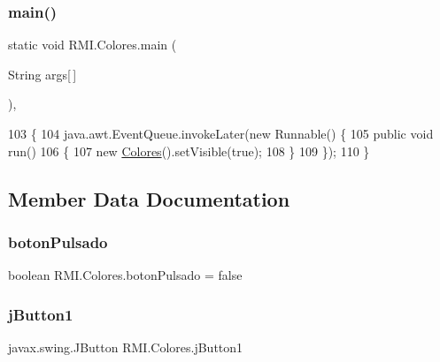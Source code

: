 \subsubsection{\texorpdfstring{main()}{main()}}
{\footnotesize\ttfamily static void R\+M\+I.\+Colores.\+main (\begin{DoxyParamCaption}\item[{String}]{args\mbox{[}$\,$\mbox{]} }\end{DoxyParamCaption})\hspace{0.3cm}{\ttfamily [inline]}, {\ttfamily [static]}}


\begin{DoxyCode}
103     \{
104         java.awt.EventQueue.invokeLater(\textcolor{keyword}{new} Runnable() \{
105             \textcolor{keyword}{public} \textcolor{keywordtype}{void} run()
106             \{
107                 \textcolor{keyword}{new} \mbox{\hyperlink{class_r_m_i_1_1_colores_a9d1a322e10d3c217309e02017973b5f0}{Colores}}().setVisible(\textcolor{keyword}{true});
108             \}
109         \});
110     \}
\end{DoxyCode}


\subsection{Member Data Documentation}
\mbox{\label{class_r_m_i_1_1_colores_af81a5077f5960e712338fe4962eadfe2}} 
\subsubsection{\texorpdfstring{boton\+Pulsado}{botonPulsado}}
{\footnotesize\ttfamily boolean R\+M\+I.\+Colores.\+boton\+Pulsado = false\hspace{0.3cm}{\ttfamily [private]}}

\mbox{\label{class_r_m_i_1_1_colores_add77873c88866ea978fcad21ad2eda75}} 
\subsubsection{\texorpdfstring{j\+Button1}{jButton1}}
{\footnotesize\ttfamily javax.\+swing.\+J\+Button R\+M\+I.\+Colores.\+j\+Button1\hspace{0.3cm}{\ttfamily [private]}}

